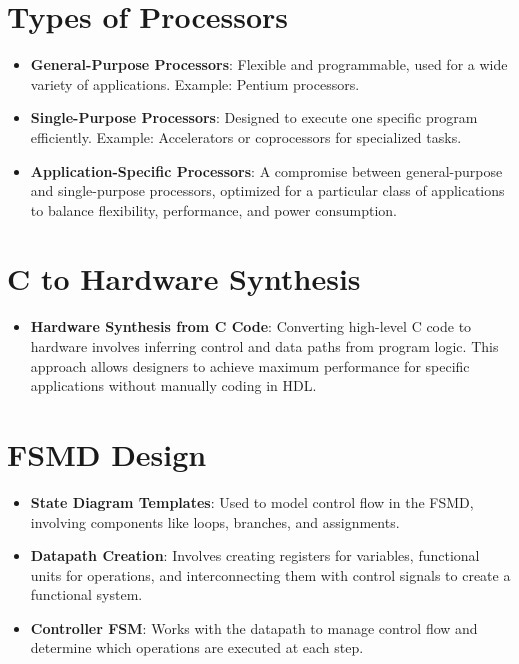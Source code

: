 \documentclass[
  14pt,
  a4paper,
  DIV=11,
  numbers=noendperiod,
  headinclude=true,
  footinclude=true]{scrreprt}
\providecommand{\tightlist}{%
  \setlength{\itemsep}{0pt}\setlength{\parskip}{0pt}}\usepackage{longtable,booktabs,array}
\begin{document}
\section{Types of Processors}\label{types-of-processors}

\begin{itemize}
\tightlist
\item
  \textbf{General-Purpose Processors}: Flexible and programmable, used
  for a wide variety of applications. Example: Pentium processors.
\item
  \textbf{Single-Purpose Processors}: Designed to execute one specific
  program efficiently. Example: Accelerators or coprocessors for
  specialized tasks.
\item
  \textbf{Application-Specific Processors}: A compromise between
  general-purpose and single-purpose processors, optimized for a
  particular class of applications to balance flexibility, performance,
  and power consumption.
\end{itemize}

\section{C to Hardware Synthesis}\label{c-to-hardware-synthesis}

\begin{itemize}
\tightlist
\item
  \textbf{Hardware Synthesis from C Code}: Converting high-level C code
  to hardware involves inferring control and data paths from program
  logic. This approach allows designers to achieve maximum performance
  for specific applications without manually coding in HDL.
\end{itemize}

\section{FSMD Design}\label{fsmd-design}

\begin{itemize}
\tightlist
\item
  \textbf{State Diagram Templates}: Used to model control flow in the
  FSMD, involving components like loops, branches, and assignments.
\item
  \textbf{Datapath Creation}: Involves creating registers for variables,
  functional units for operations, and interconnecting them with control
  signals to create a functional system.
\item
  \textbf{Controller FSM}: Works with the datapath to manage control
  flow and determine which operations are executed at each step.
\end{itemize}
\end{document}
